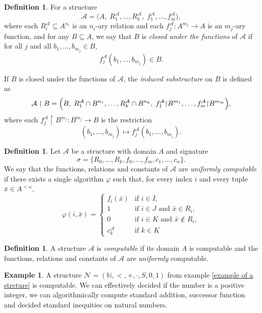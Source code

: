 \documentclass{pracalicmgr2025}
\theoremstyle{plain}            %
\theoremstyle{remark}           %
\theoremstyle{definition}       %
\newtheorem{example}[theorem]{Example}
\newtheorem{definition}[theorem]{Definition}
\begin{document}
\begin{definition}\label{substrcture-functions}
For a structure 
\[
\mathcal{A} = \bigl(A,\; R_1^{\mathcal{A}},\dots,R_k^{\mathcal{A}},\; 
f_1^{\mathcal{A}},\dots,f_m^{\mathcal{A}}\bigr),
\]
where each $R_i^{\mathcal{A}} \subseteq A^{n_i}$ is an $n_i$-ary relation and each 
$f_j^{\mathcal{A}} : A^{m_j} \to A$ is an $m_j$-ary function, and for any $B \subseteq A$, we say that $B$ is \emph{closed under the functions} of $\mathcal{A}$ if for all $j$ and all $b_1,\dots,b_{m_j} \in B$,
\[
f_j^{\mathcal{A}}(b_1,\dots,b_{m_j}) \in B.
\]

If $B$ is closed under the functions of $\mathcal{A}$, the \emph{induced substructure} on $B$ is defined as
\[
\mathcal{A} \upharpoonright B
= \Bigl(
B,\;
R_1^{\mathcal{A}} \cap B^{n_1},\dots, R_k^{\mathcal{A}} \cap B^{n_k},\;
f_1^{\mathcal{A}}{\upharpoonright} B^{m_1},\dots,
f_m^{\mathcal{A}}{\upharpoonright} B^{m_m}
\Bigr),
\]
where each $f_j^{\mathcal{A}}{\upharpoonright} B^{m_j} : B^{m_j} \to B$ is the restriction
\[
(b_1,\dots,b_{m_j}) \mapsto f_j^{\mathcal{A}}(b_1,\dots,b_{m_j}).
\]
\end{definition}


\begin{definition} \label{uniformly}
Let $\mathcal{A}$ be a structure with domain $A$ and signature 
$$\sigma = \{R_0,\dots,R_k, f_0,\dots,f_m, c_1,\dots,c_n\}.$$  
We say that the functions, relations and constants of $\mathcal{A}$ are 
\emph{uniformly computable} if there exists a single algorithm 
$\varphi$ such that, for every index $i$ and every tuple 
$\bar x \in A^{<\omega}$,
$$
\varphi(i,\bar x) =
\begin{cases}
f_i(\bar x) & \text{if } i \in I , \\[6pt]
1 & \text{if } i \in J \text{ and } 
      \bar x \in R_i, \\[6pt]
0 & \text{if } i \in K \text{ and } 
      \bar x \notin R_i, \\
c_k^\mathcal{A} & \text{if } k \in K
\end{cases}
$$
\end{definition}

\begin{definition}
    A structure $\mathcal{A}$ is \emph{computable} if its domain $A$ is computable and the functions, relations and constants of $\mathcal{A}$ are \textit{uniformly} computable.  
\end{definition}

\begin{example}
    A structure $\mathcal{N} = (\mathbb{N}, <, +, \cdot, S, 0, 1)$ from example \ref{example of a strcture} is computable. We can effectively decided if the number is a positive integer, we can algorithmically compute standard addition, successor function and decided standard inequities on natural numbers.
\end{example}
\end{document}
